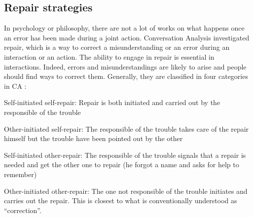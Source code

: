 \documentclass[a4paper,11pt,twoside]{StyleThese}
\begin{document}
\subsection{Repair strategies}
In psychology or philosophy, there are not a lot of works on what happens once an error has been made during a joint action. Conversation Analysis investigated repair, which is a way to correct a misunderstanding or an error during an interaction or an action. The ability to engage in repair is essential in interactions. Indeed, errors and misunderstandings are likely to arise and people should find ways to correct them. Generally, they are classified in four categories in CA \cite{schegloff_1977_preference,wooffitt_2008_conversation}:
\begin{bulletList}
	\item Self-initiated self-repair: Repair is both initiated and carried out by the responsible of the trouble
	\item Other-initiated self-repair: The responsible of the trouble takes care of the repair himself but the trouble have been pointed out by the other
	\item Self-initiated other-repair: The responsible of the trouble signals that a repair is needed and get the other one to repair (\eg he forgot a name and asks for help to remember)
	\item Other-initiated other-repair: The one not responsible of the trouble initiates and carries out the repair. This is closest to what is conventionally understood as ``correction''.
\end{bulletList}

\ifdefined{}
\else


\end{document}
